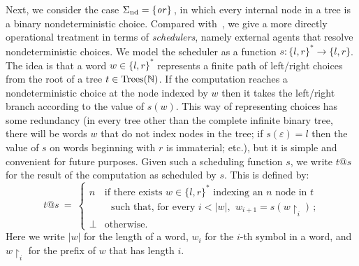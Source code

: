 Next, we consider the case $\Sigma_{\text{nd}} = \{\operatorname{\mathit{or}}\}\,$, in which every internal node in a tree is a binary nondeterministic choice.
Compared with~\cite{gom}, we give a more directly operational treatment in terms of 
 \emph{schedulers}, namely external agents that resolve nondeterministic choices.
We model the scheduler as a 
function $s: \{l,r\}^* \to \{l,r\}$. The idea is that a word $w \in \{l,r\}^*$ represents a finite path of left/right choices from the root of a 
tree $t \in \textnormal{Trees}(\mathbb{N})$. If the computation reaches a nondeterministic choice at the node indexed by 
$w$ then it takes the left/right branch according to the value of $s(w)$. This way of representing choices has some redundancy
(in every tree other than the complete infinite binary tree, there will be words $w$ that do not index nodes in the tree; if $s(\varepsilon) = l$ then the value of $s$ on words beginning with $r$ is immaterial; etc.), but it is simple and convenient for future purposes. 
Given such a scheduling function $s$, we write $t@s$ for the result of the computation as scheduled by $s$. This is defined by:
\[
t@s ~ = ~ \begin{cases} 
 n & \text{if there exists $w \in \{l,r\}^*$ indexing an $n$ node in $t$} \\
    & ~~~\text{such that, for every $i < |w|$, $~w_{i+1} = s(w\!\restriction_i)\,$;} \\
  \bot & \text{otherwise.}
 \end{cases}
\]
Here we write $|w|$ for the length of a word, $w_i$ for the $i$-th symbol in a word, and $w \!\restriction_i$ for the prefix of $w$ that has length $i$.

